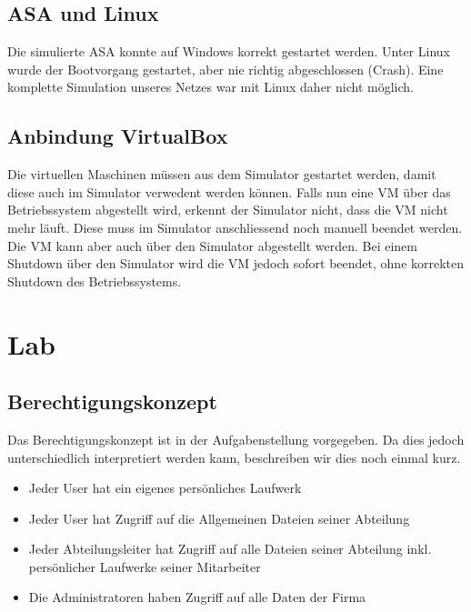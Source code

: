 \documentclass[11pt,a4paper,parskip=half]{scrartcl}
\begin{document}
\subsection{ASA und Linux}
Die simulierte ASA konnte auf Windows korrekt gestartet werden. Unter Linux wurde der Bootvorgang gestartet, aber nie richtig abgeschlossen (Crash). Eine komplette Simulation unseres Netzes war mit Linux daher nicht möglich.
\subsection{Anbindung VirtualBox}
Die virtuellen Maschinen müssen aus dem Simulator gestartet werden, damit diese auch im Simulator verwedent werden können. Falls nun eine VM über das Betriebssystem abgestellt wird, erkennt der Simulator nicht, dass die VM nicht mehr läuft. Diese muss im Simulator anschliessend noch manuell beendet werden.\\
Die VM kann aber auch über den Simulator abgestellt werden. Bei einem Shutdown über den Simulator wird die VM jedoch sofort beendet, ohne korrekten Shutdown des Betriebssystems.

\newpage
\section{Lab}
\subsection{Berechtigungskonzept}
Das Berechtigungskonzept ist in der Aufgabenstellung vorgegeben. Da dies jedoch unterschiedlich interpretiert werden kann, beschreiben wir dies noch einmal kurz.

\begin{itemize}
\item{Jeder User hat ein eigenes persönliches Laufwerk}
\item{Jeder User hat Zugriff auf die Allgemeinen Dateien seiner Abteilung}
\item{Jeder Abteilungsleiter hat Zugriff auf alle Dateien seiner Abteilung inkl. persönlicher Laufwerke seiner Mitarbeiter}
\item{Die Administratoren haben Zugriff auf alle Daten der Firma}
\end{itemize}
\end{document}

